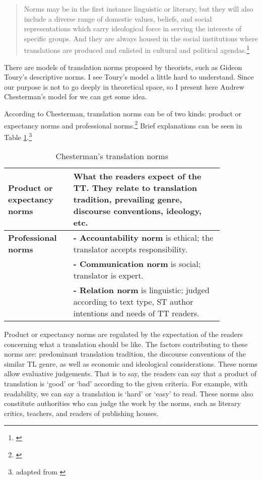 \begin{quote}
Norms may be in the first instance linguistic or literary, but they will also include a diverse range of domestic values, beliefs, and social representations which carry ideological force in serving the interests of specific groups. And they are always housed in the social institutions where translations are produced and enlisted in cultural and political agendas.\footnote{\citealp[p.~29]{venuti:scandals}}
\end{quote}

There are models of translation norms proposed by theorists, such as Gideon Toury's descriptive norms. I see Toury's model a little hard to understand. Since our purpose is not to go deeply in theoretical space, so I present here Andrew Chesterman's model for we can get some idea.

According to Chesterman, translation norms can be of two kinds: product or expectancy norms and professional norms.\footnote{\citealp[pp.~62--8]{chesterman:memes}} Brief explanations can be seen in Table \ref{tab:chestnorms}.\footnote{adapted from \citealp[pp.~187--8]{munday:translation}}

\begin{table}[!hbt]
\centering
\caption{Chesterman's translation norms}
\label{tab:chestnorms}
\bigskip
\begin{tabular}{>{\raggedright\arraybackslash\bfseries}p{0.25\linewidth}>{\raggedright\arraybackslash}p{0.6\linewidth}} \toprule
Product or expectancy norms & What the readers expect of the TT. They relate to translation tradition, prevailing genre, discourse conventions, ideology, etc. \\
\midrule
Professional norms & \textbf{- Accountability norm} is ethical; the translator accepts responsibility. \\
& \textbf{- Communication norm} is social; translator is expert.\\
& \textbf{- Relation norm} is linguistic; judged according to text type, ST author intentions and needs of TT readers. \\
\bottomrule
\end{tabular}
\end{table}

Product or expectancy norms are regulated by the expectation of the readers concerning what a translation should be like. The factors contributing to these norms are: predominant translation tradition, the discourse conventions of the similar TL genre, as well as economic and ideological considerations. These norms allow evaluative judgements. That is to say, the readers can say that a product of translation is `good' or `bad' according to the given criteria. For example, with readability, we can say a translation is `hard' or `easy' to read. These norms also constitute authorities who can judge the work by the norms, such as literary critics, teachers, and readers of publishing houses. 

